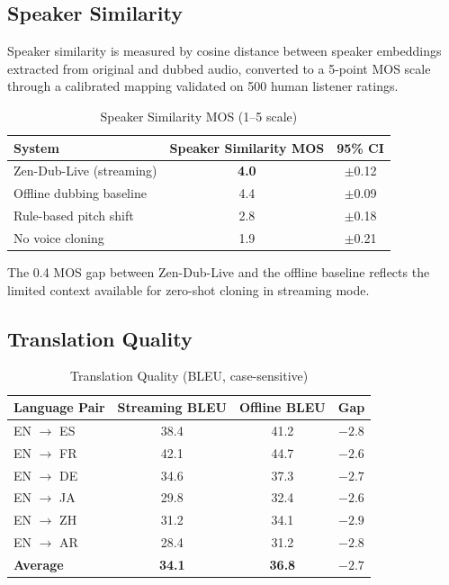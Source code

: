 \documentclass[11pt,a4paper]{article}
\begin{document}
\subsection{Speaker Similarity}

Speaker similarity is measured by cosine distance between speaker embeddings extracted from original and dubbed audio, converted to a 5-point MOS scale through a calibrated mapping validated on 500 human listener ratings.

\begin{table}[H]
\centering
\caption{Speaker Similarity MOS (1--5 scale)}
\begin{tabular}{lcc}
\toprule
\textbf{System} & \textbf{Speaker Similarity MOS} & \textbf{95\% CI} \\
\midrule
Zen-Dub-Live (streaming) & \textbf{4.0} & $\pm$0.12 \\
Offline dubbing baseline & 4.4 & $\pm$0.09 \\
Rule-based pitch shift & 2.8 & $\pm$0.18 \\
No voice cloning & 1.9 & $\pm$0.21 \\
\bottomrule
\end{tabular}
\end{table}

The 0.4 MOS gap between Zen-Dub-Live and the offline baseline reflects the limited context available for zero-shot cloning in streaming mode.

\subsection{Translation Quality}

\begin{table}[H]
\centering
\caption{Translation Quality (BLEU, case-sensitive)}
\begin{tabular}{lccc}
\toprule
\textbf{Language Pair} & \textbf{Streaming BLEU} & \textbf{Offline BLEU} & \textbf{Gap} \\
\midrule
EN $\to$ ES & 38.4 & 41.2 & $-2.8$ \\
EN $\to$ FR & 42.1 & 44.7 & $-2.6$ \\
EN $\to$ DE & 34.6 & 37.3 & $-2.7$ \\
EN $\to$ JA & 29.8 & 32.4 & $-2.6$ \\
EN $\to$ ZH & 31.2 & 34.1 & $-2.9$ \\
EN $\to$ AR & 28.4 & 31.2 & $-2.8$ \\
\textbf{Average} & \textbf{34.1} & \textbf{36.8} & $\mathbf{-2.7}$ \\
\bottomrule
\end{tabular}
\end{table}
\end{document}
